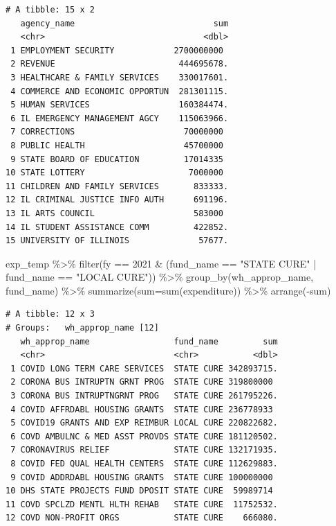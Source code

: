 \documentclass[
  letterpaper,
  DIV=11,
  numbers=noendperiod]{scrreport}
\newenvironment{Shaded}{\begin{snugshade}}{\end{snugshade}}
\newcommand{\AttributeTok}[1]{\textcolor[rgb]{0.40,0.45,0.13}{#1}}
\newcommand{\DecValTok}[1]{\textcolor[rgb]{0.68,0.00,0.00}{#1}}
\newcommand{\FunctionTok}[1]{\textcolor[rgb]{0.28,0.35,0.67}{#1}}
\newcommand{\NormalTok}[1]{\textcolor[rgb]{0.00,0.23,0.31}{#1}}
\newcommand{\SpecialCharTok}[1]{\textcolor[rgb]{0.37,0.37,0.37}{#1}}
\newcommand{\StringTok}[1]{\textcolor[rgb]{0.13,0.47,0.30}{#1}}
\begin{document}
\begin{verbatim}
# A tibble: 15 x 2
   agency_name                            sum
   <chr>                                <dbl>
 1 EMPLOYMENT SECURITY            2700000000 
 2 REVENUE                         444695678.
 3 HEALTHCARE & FAMILY SERVICES    330017601.
 4 COMMERCE AND ECONOMIC OPPORTUN  281301115.
 5 HUMAN SERVICES                  160384474.
 6 IL EMERGENCY MANAGEMENT AGCY    115063966.
 7 CORRECTIONS                      70000000 
 8 PUBLIC HEALTH                    45700000 
 9 STATE BOARD OF EDUCATION         17014335 
10 STATE LOTTERY                     7000000 
11 CHILDREN AND FAMILY SERVICES       833333.
12 IL CRIMINAL JUSTICE INFO AUTH      691196.
13 IL ARTS COUNCIL                    583000 
14 IL STUDENT ASSISTANCE COMM         422852.
15 UNIVERSITY OF ILLINOIS              57677.
\end{verbatim}

\begin{Shaded}
\begin{Highlighting}[]
\NormalTok{exp\_temp }\SpecialCharTok{\%\textgreater{}\%} \FunctionTok{filter}\NormalTok{(fy }\SpecialCharTok{==} \DecValTok{2021} \SpecialCharTok{\&}\NormalTok{ (fund\_name }\SpecialCharTok{==} \StringTok{"STATE CURE"} \SpecialCharTok{|}\NormalTok{ fund\_name }\SpecialCharTok{==} \StringTok{"LOCAL CURE"}\NormalTok{)) }\SpecialCharTok{\%\textgreater{}\%} \FunctionTok{group\_by}\NormalTok{(wh\_approp\_name, fund\_name) }\SpecialCharTok{\%\textgreater{}\%} \FunctionTok{summarize}\NormalTok{(}\AttributeTok{sum=}\FunctionTok{sum}\NormalTok{(expenditure)) }\SpecialCharTok{\%\textgreater{}\%} \FunctionTok{arrange}\NormalTok{(}\SpecialCharTok{{-}}\NormalTok{sum)}
\end{Highlighting}
\end{Shaded}

\begin{verbatim}
# A tibble: 12 x 3
# Groups:   wh_approp_name [12]
   wh_approp_name                 fund_name         sum
   <chr>                          <chr>           <dbl>
 1 COVID LONG TERM CARE SERVICES  STATE CURE 342893715.
 2 CORONA BUS INTRUPTN GRNT PROG  STATE CURE 319800000 
 3 CORONA BUS INTRUPTNGRNT PROG   STATE CURE 261795226.
 4 COVID AFFRDABL HOUSING GRANTS  STATE CURE 236778933 
 5 COVID19 GRANTS AND EXP REIMBUR LOCAL CURE 220822682.
 6 COVD AMBULNC & MED ASST PROVDS STATE CURE 181120502.
 7 CORONAVIRUS RELIEF             STATE CURE 132171935.
 8 COVID FED QUAL HEALTH CENTERS  STATE CURE 112629883.
 9 COVID ADDRDABL HOUSING GRANTS  STATE CURE 100000000 
10 DHS STATE PROJECTS FUND DPOSIT STATE CURE  59989714 
11 COVD SPCLZD MENTL HLTH REHAB   STATE CURE  11752532.
12 COVD NON-PROFIT ORGS           STATE CURE    666080.
\end{verbatim}
\end{document}
